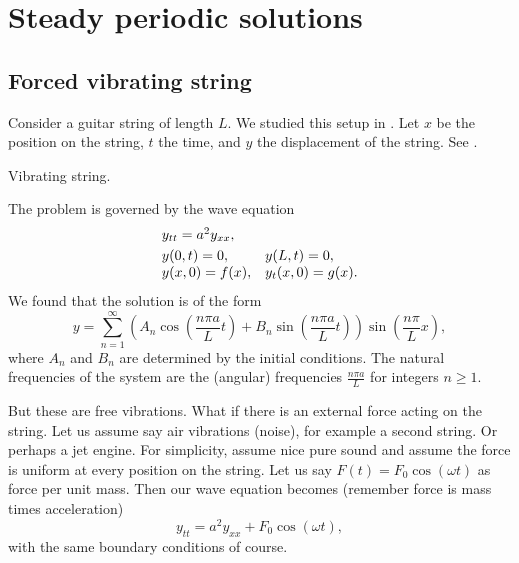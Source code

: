 \sectionnewpage
\section{Steady periodic solutions}
\label{sps:section}


\subsection{Forced vibrating string}

Consider a guitar string of length $L$.  We studied this 
setup in .
Let $x$ be the position on the string, $t$ the time, and $y$ the displacement of the string.  See
.

\begin{myfig}
\capstart
{}
\caption{Vibrating string.\label{sps:vibstrfig}}
\end{myfig}

The problem is governed by the wave equation
\begin{equation} \label{sps:freevib}
\begin{array}{ll}
y_{tt} = a^2 y_{xx} , & \\
\noalign{\smallskip}
y(0,t) = 0 , & y(L,t) = 0 , \\
y(x,0) = f(x) , & y_t(x,0) = g(x) .
\end{array}
\end{equation}
We found that the solution is of the form
\begin{equation*}
y = 
\sum_{n=1}^\infty \left( A_n \cos \left( \frac{n\pi a}{L} t \right) +
B_n \sin \left( \frac{n\pi a}{L} t \right) \right)
\sin \left( \frac{n\pi}{L} x \right) ,
\end{equation*}
where $A_n$ and $B_n$ are determined by the initial conditions.  The natural
frequencies of the system are the (angular) frequencies $\frac{n \pi a}{L}$
for integers $n \geq 1$.

But these are free vibrations.  What if there is an external force acting on
the string.  Let us assume say air vibrations (noise), for example a second
string.  Or perhaps a jet engine.  For simplicity, assume nice pure
sound and assume the force is uniform at every position on the string.
Let us say $F(t) = F_0 \cos (\omega t)$ as force per unit mass.  Then our wave
equation becomes (remember force is mass times acceleration)
\begin{equation} \label{sps:forcedeq}
y_{tt} = a^2 y_{xx} + F_0 \cos ( \omega t) ,
\end{equation}
with the same boundary conditions of course.

